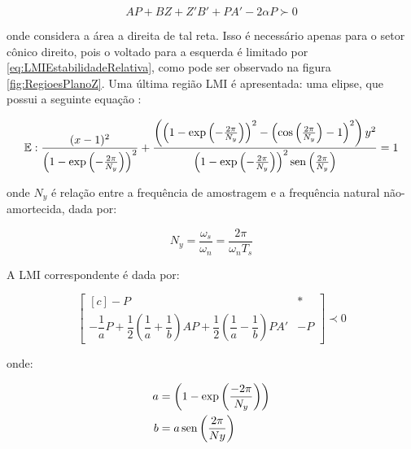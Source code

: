 \begin{equation}
  AP + BZ + Z'B' + PA' -2\alpha P\label{eq:LMIRightBounded} \succ 0
\end{equation}

\noindent onde considera a área a direita de tal reta. Isso é necessário apenas para o setor cônico direito, pois o voltado para a  esquerda é limitado por \eqref{eq:LMIEstabilidadeRelativa}, como pode ser observado na figura \ref{fig:RegioesPlanoZ}. Uma última região LMI é apresentada: uma elipse, que possui a seguinte equação \cite{CHIQUETO2021}:

\begin{equation}
  \mathbb{E}: \dfrac{(x-1)^2}{\left(1-\exp{\left(-\frac{2\pi}{N_y}\right)}\right)^2} + \dfrac{\left(\left(1-\exp{\left(-\frac{2\pi}{N_y}\right)}\right)^2 - \left(\cos{\left(\frac{2\pi}{N_y}\right)} - 1\right)^2\right)y^2}{\left(1-\exp{\left(-\frac{2\pi}{N_y}\right)}\right)^2\operatorname{sen}{\left(\frac{2\pi}{N_y}\right)}} = 1\label{eq:Elipse}
\end{equation}

\noindent onde $N_y$ é relação entre a frequência de amostragem e a frequência natural não-amortecida, dada por:

\begin{equation}
  N_y = \dfrac{\omega_s}{\omega_n} = \dfrac{2\pi}{\omega_nT_s}\label{eq:ConstanteNy}
\end{equation}

A LMI correspondente é dada por:

\begin{equation}
  \begin{bmatrix*}[c]
    -P & *\\
    -\dfrac{1}{a}P + \dfrac{1}{2}\left(\dfrac{1}{a}+\dfrac{1}{b}\right)AP + \dfrac{1}{2}\left(\dfrac{1}{a}-\dfrac{1}{b}\right)PA' & -P
  \end{bmatrix*}
  \prec 0\label{eq:LMIElipse}
\end{equation}

\noindent onde:

\begin{subequations}
  \label{eq:PontosElipse}
  \begin{align}
    a &= \left(1-\exp{\left(\frac{-2\pi}{N_y}\right)}\right)\label{eq:PontoAElipse}\\
    b &= a\operatorname{sen}{\left(\frac{2\pi}{Ny}\right)}\label{eq:PontoBElipse}
  \end{align}
\end{subequations}